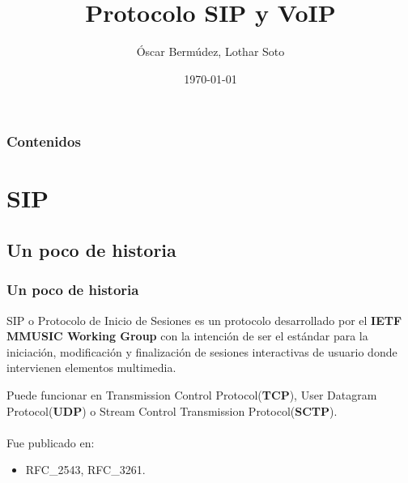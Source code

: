 \documentclass{beamer}
\title[Título]{Protocolo SIP y VoIP} %
\author{Óscar Bermúdez, Lothar Soto} %
\institute[UGR] %
{
  Universidad de Granada \\ %
  \medskip
  \textit{autor@ugr.correo.es} %
}
\date{\today} %
\begin{document}
\begin{frame}
\titlepage %
\end{frame}

\begin{frame}
  \frametitle{Contenidos} %
  \tableofcontents
\end{frame}




\section{SIP} %

\subsection{Un poco de historia} %
\begin{frame}
\frametitle{Un poco de historia}
SIP o Protocolo de Inicio de Sesiones es un protocolo desarrollado por el \textbf{IETF MMUSIC Working Group} con la intención de ser el estándar para la iniciación, modificación y finalización de sesiones interactivas de usuario donde intervienen elementos multimedia.
	
	Puede funcionar en Transmission Control Protocol(\textbf{TCP}), User Datagram Protocol(\textbf{UDP}) o Stream Control Transmission Protocol(\textbf{SCTP}).\\~\\
	Fue publicado en:
	\begin{itemize}
	\item RFC\_2543, RFC\_3261.
	\end{itemize}
\end{frame}
\end{document}
